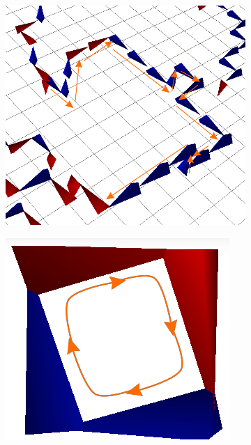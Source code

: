 %
\begin{figure}[htb!]
\centering
    \begin{subfigure}[b]{0.3\textwidth}
	\includegraphics[width=\textwidth]{./plaqt1_line.png}
    \end{subfigure}\hfill
    \begin{subfigure}[b]{0.3\textwidth}
    \includegraphics[width=\textwidth]{./plaqt1_loop.png}

\end{subfigure}
\end{figure}
